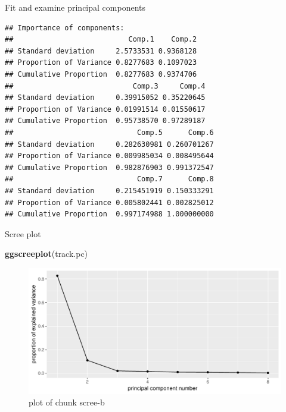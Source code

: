 \documentclass[ignorenonframetext,]{beamer}
\newenvironment{Shaded}{\begin{snugshade}}{\end{snugshade}}
\newcommand{\DataTypeTok}[1]{\textcolor[rgb]{0.13,0.29,0.53}{#1}}
\newcommand{\KeywordTok}[1]{\textcolor[rgb]{0.13,0.29,0.53}{\textbf{#1}}}
\newcommand{\NormalTok}[1]{#1}
\newcommand{\OperatorTok}[1]{\textcolor[rgb]{0.81,0.36,0.00}{\textbf{#1}}}
\newcommand{\StringTok}[1]{\textcolor[rgb]{0.31,0.60,0.02}{#1}}
\begin{document}
\begin{frame}[fragile]{Fit and examine principal components}
\protect\hypertarget{fit-and-examine-principal-components}{}

\begin{Shaded}
\end{Shaded}

\begin{verbatim}
## Importance of components:
##                           Comp.1    Comp.2
## Standard deviation     2.5733531 0.9368128
## Proportion of Variance 0.8277683 0.1097023
## Cumulative Proportion  0.8277683 0.9374706
##                            Comp.3     Comp.4
## Standard deviation     0.39915052 0.35220645
## Proportion of Variance 0.01991514 0.01550617
## Cumulative Proportion  0.95738570 0.97289187
##                             Comp.5      Comp.6
## Standard deviation     0.282630981 0.260701267
## Proportion of Variance 0.009985034 0.008495644
## Cumulative Proportion  0.982876903 0.991372547
##                             Comp.7      Comp.8
## Standard deviation     0.215451919 0.150333291
## Proportion of Variance 0.005802441 0.002825012
## Cumulative Proportion  0.997174988 1.000000000
\end{verbatim}

\end{frame}

\begin{frame}[fragile]{Scree plot}
\protect\hypertarget{scree-plot-2}{}

\begin{Shaded}
\begin{Highlighting}[]
\KeywordTok{ggscreeplot}\NormalTok{(track.pc)}
\end{Highlighting}
\end{Shaded}

\begin{figure}
\centering
\includegraphics{figure/scree-b-1.pdf}
\caption{plot of chunk scree-b}
\end{figure}

\end{frame}
\end{document}

